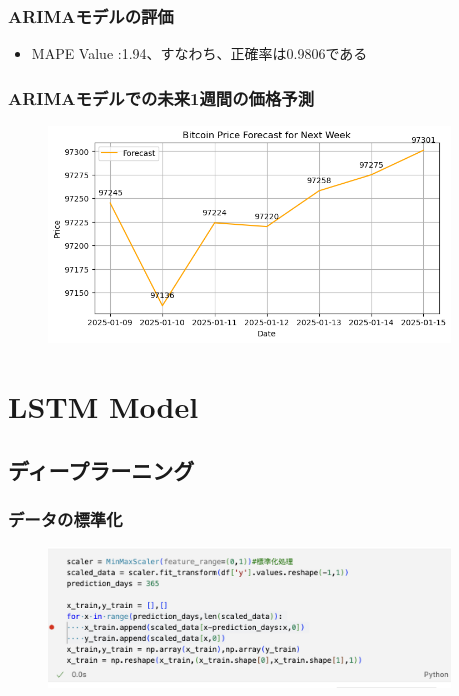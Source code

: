 \documentclass{beamer}  %
\begin{document}
\begin{frame}
    \frametitle{ARIMAモデルの評価}
    \begin{itemize}
        \item MAPE Value :1.94、すなわち、正確率は0.9806である
    \end{itemize}
\end{frame}


\begin{frame}
    \frametitle{ARIMAモデルでの未来1週間の価格予測}
    \begin{figure}[h]
        \begin{center}
            \includegraphics[keepaspectratio, width=0.95\textwidth]{pic/ar2.png}
        \end{center}
    \end{figure}
\end{frame}

\section{LSTM Model}

\subsection{ディープラーニング}
\begin{frame}
    \frametitle{データの標準化}
    \begin{figure}[h]
        \begin{center}
            \includegraphics[keepaspectratio, width=0.95\textwidth]{pic/dl0.png}
        \end{center}
    \end{figure}
\end{frame}
\end{document}
